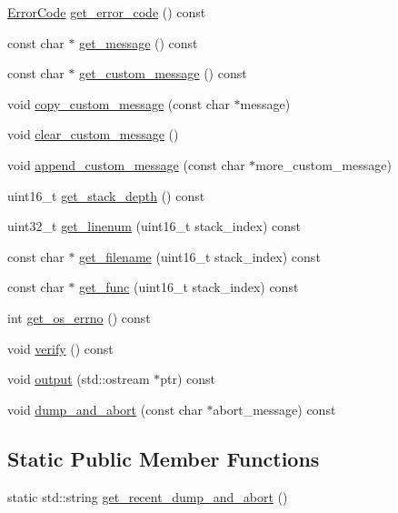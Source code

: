 \begin{DoxyCompactItemize}
\item 
\hyperlink{group__ERRORCODES_ga6263a3c9a0b8d36aea21cdd835ac99fe}{Error\+Code} \hyperlink{classalps_1_1ErrorStack_acad692aa115b80ee36ad173c5aa9e2eb}{get\+\_\+error\+\_\+code} () const 
\item 
const char $\ast$ \hyperlink{classalps_1_1ErrorStack_ad6d3e825281c3bc8ed7aee7ba0a35b74}{get\+\_\+message} () const 
\item 
const char $\ast$ \hyperlink{classalps_1_1ErrorStack_aa5814d07d45601b0f54b77c2b456ba8c}{get\+\_\+custom\+\_\+message} () const 
\item 
void \hyperlink{classalps_1_1ErrorStack_a68a61726008208d49521db039a18d2d9}{copy\+\_\+custom\+\_\+message} (const char $\ast$message)
\item 
void \hyperlink{classalps_1_1ErrorStack_a416b4574f9f73063720cb20c620dad51}{clear\+\_\+custom\+\_\+message} ()
\item 
void \hyperlink{classalps_1_1ErrorStack_ae89827aafd6095698f9b223ebecea40b}{append\+\_\+custom\+\_\+message} (const char $\ast$more\+\_\+custom\+\_\+message)
\item 
uint16\+\_\+t \hyperlink{classalps_1_1ErrorStack_aeb0920c79b84e369eecd694cc8261ff1}{get\+\_\+stack\+\_\+depth} () const 
\item 
uint32\+\_\+t \hyperlink{classalps_1_1ErrorStack_ae4b6ae74770f2f45e9f6161785c05b2b}{get\+\_\+linenum} (uint16\+\_\+t stack\+\_\+index) const 
\item 
const char $\ast$ \hyperlink{classalps_1_1ErrorStack_ad13251b97c0b40b0901f606f9d6d5384}{get\+\_\+filename} (uint16\+\_\+t stack\+\_\+index) const 
\item 
const char $\ast$ \hyperlink{classalps_1_1ErrorStack_a738f149173bc7e9a7be827dd7a02de8f}{get\+\_\+func} (uint16\+\_\+t stack\+\_\+index) const 
\item 
int \hyperlink{classalps_1_1ErrorStack_a1d7e8a20295213f32de56a5b77b976c1}{get\+\_\+os\+\_\+errno} () const 
\item 
void \hyperlink{classalps_1_1ErrorStack_ad157dbc40b5c2eaccd44dd7347296a45}{verify} () const 
\item 
void \hyperlink{classalps_1_1ErrorStack_afe67ad7f9830b1ef263f867109230b54}{output} (std\+::ostream $\ast$ptr) const 
\item 
void \hyperlink{classalps_1_1ErrorStack_a30461e6b34692f7ee11db1995d52d0ac}{dump\+\_\+and\+\_\+abort} (const char $\ast$abort\+\_\+message) const 
\end{DoxyCompactItemize}
\subsection*{Static Public Member Functions}
\begin{DoxyCompactItemize}
\item 
static std\+::string \hyperlink{classalps_1_1ErrorStack_a4e7dfdf688e6a33bbda2cfebf3a396a7}{get\+\_\+recent\+\_\+dump\+\_\+and\+\_\+abort} ()
\end{DoxyCompactItemize}
